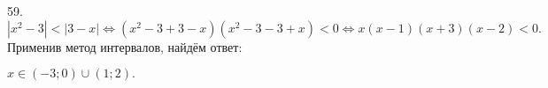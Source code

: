 59. $|x^2-3|<|3-x|\Leftrightarrow (x^2-3+3-x)(x^2-3-3+x)<0 \Leftrightarrow x(x-1)(x+3)(x-2)<0.$ Применив метод интервалов, найдём ответ:
\begin{figure}[ht!]
\end{figure}
$x\in(-3;0)\cup(1;2).$\\
